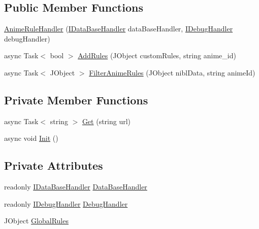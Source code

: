 \subsection*{Public Member Functions}
\begin{DoxyCompactItemize}
\item 
\mbox{\hyperlink{class_little_weeb_library_1_1_handlers_1_1_anime_rule_handler_a71cb7aa9d7e5df35ae28ac4fcb11a51f}{Anime\+Rule\+Handler}} (\mbox{\hyperlink{interface_little_weeb_library_1_1_handlers_1_1_i_data_base_handler}{I\+Data\+Base\+Handler}} data\+Base\+Handler, \mbox{\hyperlink{interface_little_weeb_library_1_1_handlers_1_1_i_debug_handler}{I\+Debug\+Handler}} debug\+Handler)
\item 
async Task$<$ bool $>$ \mbox{\hyperlink{class_little_weeb_library_1_1_handlers_1_1_anime_rule_handler_a469232c6b73d0ceff935c4ef2d78d039}{Add\+Rules}} (J\+Object custom\+Rules, string anime\+\_\+id)
\item 
async Task$<$ J\+Object $>$ \mbox{\hyperlink{class_little_weeb_library_1_1_handlers_1_1_anime_rule_handler_a503fb2839489e1df8b80c9a461c0fd2b}{Filter\+Anime\+Rules}} (J\+Object nibl\+Data, string anime\+Id)
\end{DoxyCompactItemize}
\subsection*{Private Member Functions}
\begin{DoxyCompactItemize}
\item 
async Task$<$ string $>$ \mbox{\hyperlink{class_little_weeb_library_1_1_handlers_1_1_anime_rule_handler_a721f5c5ac798ca7e81286b3f401921fb}{Get}} (string url)
\item 
async void \mbox{\hyperlink{class_little_weeb_library_1_1_handlers_1_1_anime_rule_handler_a719277ca087cc0e4b46708179d62b07f}{Init}} ()
\end{DoxyCompactItemize}
\subsection*{Private Attributes}
\begin{DoxyCompactItemize}
\item 
readonly \mbox{\hyperlink{interface_little_weeb_library_1_1_handlers_1_1_i_data_base_handler}{I\+Data\+Base\+Handler}} \mbox{\hyperlink{class_little_weeb_library_1_1_handlers_1_1_anime_rule_handler_a31322132913e3f4b669e14a3e621a326}{Data\+Base\+Handler}}
\item 
readonly \mbox{\hyperlink{interface_little_weeb_library_1_1_handlers_1_1_i_debug_handler}{I\+Debug\+Handler}} \mbox{\hyperlink{class_little_weeb_library_1_1_handlers_1_1_anime_rule_handler_a6ad89134d97d818f3b2deebb7e2cf361}{Debug\+Handler}}
\item 
J\+Object \mbox{\hyperlink{class_little_weeb_library_1_1_handlers_1_1_anime_rule_handler_aff5df38f10696987486267a30095ad49}{Global\+Rules}}
\end{DoxyCompactItemize}


